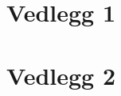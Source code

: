 \documentclass[main.tex]{subfiles}
\begin{document}
\appendix
\section{Vedlegg 1}




\section{Vedlegg 2}
\end{document}
